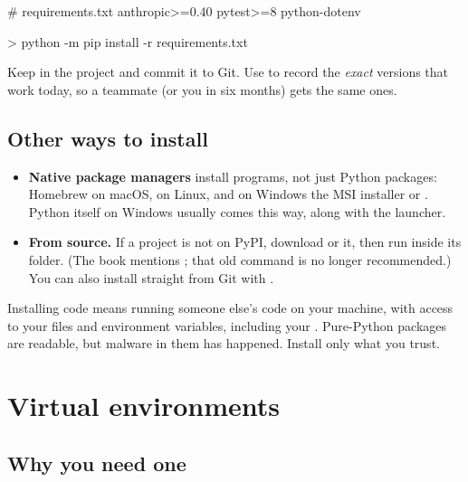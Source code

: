 \begin{rawcode}
# requirements.txt
anthropic>=0.40
pytest>=8
python-dotenv

> python -m pip install -r requirements.txt
\end{rawcode}

\begin{gamerule}
Keep  in the project and commit it to Git. Use 
to record the \emph{exact} versions that work today, so a teammate (or you in six months) gets the same ones.
\end{gamerule}

\subsection{Other ways to install}

\begin{itemize}[leftmargin=*,itemsep=1pt]
\item \textbf{Native package managers} install programs, not just Python packages: Homebrew on
  macOS,  on Linux, and on Windows the MSI installer or . Python itself
  on Windows usually comes this way, along with the  launcher.
\item \textbf{From source.} If a project is not on PyPI, download or  it, then run
   inside its folder. (The book mentions ;
  that old command is no longer recommended.) You can also install straight from Git with
  .
\end{itemize}

\begin{trap}
Installing code means running someone else's code on your machine, with access to your files and
environment variables, including your . Pure-Python packages are readable, but
malware in them has happened. Install only what you trust.
\end{trap}

\section{Virtual environments}

\subsection{Why you need one}


